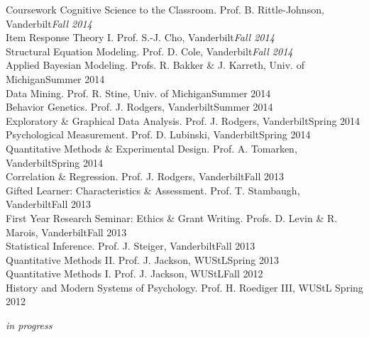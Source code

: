 \documentclass {resume}
\begin{document}
\begin{rSection}{\textrm{Coursework}}
Cognitive Science to the Classroom. Prof. B. Rittle-Johnson, Vanderbilt\hfill  {\textit{Fall 2014}}\smallskip\\
Item Response Theory \textrm{I}. Prof. S.-J. Cho, Vanderbilt\hfill  {\textit{Fall 2014}}\smallskip\\
Structural Equation Modeling. Prof. D. Cole, Vanderbilt\hfill  {\textit{Fall 2014}}\smallskip\\%
Applied Bayesian Modeling. Profs. R. Bakker \& J. Karreth, Univ. of Michigan\hfill  {Summer 2014}\smallskip\\
Data Mining. Prof. R. Stine, Univ. of Michigan\hfill  {Summer 2014}\smallskip\\
Behavior Genetics. Prof. J. Rodgers, Vanderbilt\hfill  {Summer 2014}\smallskip\\
Exploratory \& Graphical Data Analysis. Prof. J. Rodgers, Vanderbilt\hfill  {Spring 2014}\smallskip\\
Psychological Measurement. Prof. D. Lubinski, Vanderbilt\hfill  {Spring 2014}\smallskip\\
Quantitative Methods \& Experimental Design. Prof. A. Tomarken, Vanderbilt\hfill  {Spring 2014}\smallskip\\
Correlation \& Regression. Prof. J. Rodgers, Vanderbilt\hfill  {Fall 2013}\smallskip\\
Gifted Learner: Characteristics \& Assessment. Prof. T. Stambaugh, Vanderbilt\hfill  {Fall 2013}\smallskip\\
First Year Research Seminar: Ethics \& Grant Writing. Profs. D. Levin \& R. Marois, Vanderbilt\hfill  {Fall 2013}\smallskip\\
Statistical Inference. Prof. J. Steiger, Vanderbilt\hfill  {Fall 2013}\smallskip\\
Quantitative Methods \textrm{II}. Prof. J. Jackson, WUStL\hfill  {Spring 2013}\smallskip\\
Quantitative Methods \textrm{I}. Prof. J. Jackson, WUStL\hfill  {Fall 2012}\smallskip\\
History and Modern Systems of Psychology. Prof. H. Roediger \textrm{III}, WUStL \hfill  {Spring 2012}\vspace{-2mm}\begin{center}\footnotesize{ %
\textit{in progress}
}\end{center} \vspace{-4mm}
\end{rSection}
\end{document}
